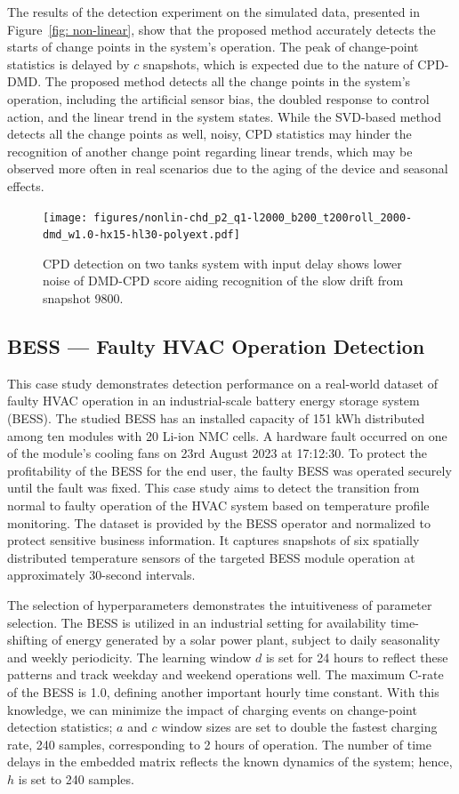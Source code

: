 The results of the detection experiment on the simulated data, presented in Figure~\ref{fig: non-linear}, show that the proposed method accurately detects the starts of change points in the system's operation. The peak of change-point statistics is delayed by \(c\) snapshots, which is expected due to the nature of CPD-DMD. The proposed method detects all the change points in the system's operation, including the artificial sensor bias, the doubled response to control action, and the linear trend in the system states. While the SVD-based method detects all the change points as well, noisy, CPD statistics may hinder the recognition of another change point regarding linear trends, which may be observed more often in real scenarios due to the aging of the device and seasonal effects.

\begin{figure}[H]
	\centering
	\texttt{[image: figures/nonlin-chd\_p2\_q1-l2000\_b200\_t200roll\_2000-dmd\_w1.0-hx15-hl30-polyext.pdf]}
	\caption{CPD detection on two tanks system with input delay shows lower noise of DMD-CPD score aiding recognition of the slow drift from snapshot 9800.}\label{fig:nonlinear}
\end{figure}

\subsection{BESS --- Faulty HVAC Operation Detection}
This case study demonstrates detection performance on a real-world dataset of faulty HVAC operation in an industrial-scale battery energy storage system (BESS). The studied BESS has an installed capacity of 151 kWh distributed among ten modules with 20 Li-ion NMC cells. A hardware fault occurred on one of the module's cooling fans on 23rd August 2023 at 17:12:30. To protect the profitability of the BESS for the end user, the faulty BESS was operated securely until the fault was fixed. This case study aims to detect the transition from normal to faulty operation of the HVAC system based on temperature profile monitoring. The dataset is provided by the BESS operator and normalized to protect sensitive business information. It captures snapshots of six spatially distributed temperature sensors of the targeted BESS module operation at approximately 30-second intervals.

The selection of hyperparameters demonstrates the intuitiveness of parameter selection. The BESS is utilized in an industrial setting for availability time-shifting of energy generated by a solar power plant, subject to daily seasonality and weekly periodicity. The learning window \(d\) is set for 24 hours to reflect these patterns and track weekday and weekend operations well. The maximum C-rate of the BESS is 1.0, defining another important hourly time constant. With this knowledge, we can minimize the impact of charging events on change-point detection statistics; \(a\) and \(c\) window sizes are set to double the fastest charging rate, 240 samples, corresponding to 2 hours of operation. The number of time delays in the embedded matrix reflects the known dynamics of the system; hence, \(h\) is set to 240 samples.

